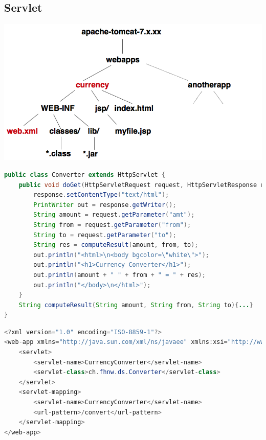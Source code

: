 \documentclass[10pt]{article}
\begin{document}
\subsection{Servlet}
\includegraphics[scale=0.5]{tomcat-structure.png}
\begin{lstlisting}[language=Java, caption=Servlet Example, style=JavaStyle]
public class Converter extends HttpServlet {
	public void doGet(HttpServletRequest request, HttpServletResponse response) throws IOException {
		response.setContentType("text/html");
		PrintWriter out = response.getWriter();
		String amount = request.getParameter("amt"); 
		String from = request.getParameter("from"); 
		String to = request.getParameter("to"); 
		String res = computeResult(amount, from, to);
		out.println("<html>\n<body bgcolor=\"white\">"); 
		out.println("<h1>Currency Converter</h1>"); 
		out.println(amount + " " + from + " = " + res);
		out.println("</body>\n</html>");
	}
	String computeResult(String amount, String from, String to){...}
}
\end{lstlisting}
\begin{lstlisting}[language=Java, caption=web.xml, style=JavaStyle]
<?xml version="1.0" encoding="ISO-8859-1"?>
<web-app xmlns="http://java.sun.com/xml/ns/javaee" xmlns:xsi="http://www.w3.org/2001/XMLSchema-instance" xsi:schemaLocation="http://java.sun.com/xml/ns/javaee http://java.sun.com/xml/ns/javaee/web-app_3_0.xsd" version="3.0">
    <servlet>
        <servlet-name>CurrencyConverter</servlet-name>
        <servlet-class>ch.fhnw.ds.Converter</servlet-class>
    </servlet>
    <servlet-mapping>
        <servlet-name>CurrencyConverter</servlet-name>
		<url-pattern>/convert</url-pattern>
	</servlet-mapping>
</web-app>
\end{lstlisting}

\end{document}
